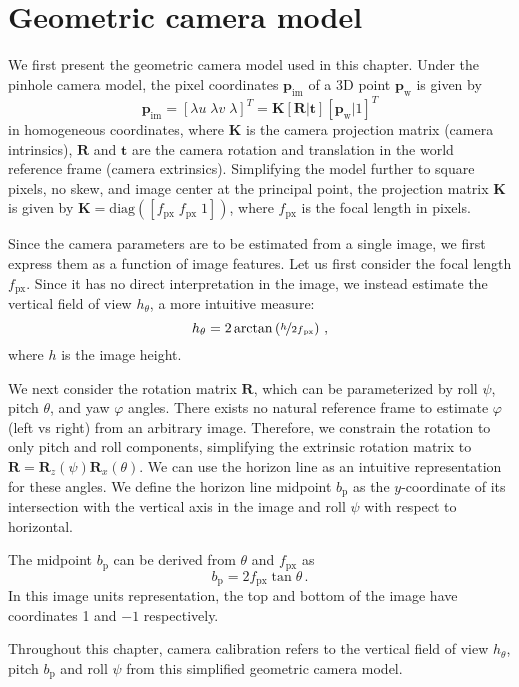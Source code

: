 \section{Geometric camera model}
\label{sec:camera-model}

We first present the geometric camera model used in this chapter. 
Under the pinhole camera model, the pixel coordinates $\mathbf{p}_\mathrm{im}$ of a 3D point $\mathbf{p}_\mathrm{w}$ is given by
%
\begin{equation}
\mathbf{p}_{\mathrm{im}} = [\lambda u \; \lambda v \; \lambda]^T = \mathbf{K} \left[\mathbf{R} | \mathbf{t}\right] \left[ \mathbf{p}_{\mathrm{w}} | 1 \right]^T
\end{equation}
%
in homogeneous coordinates, where $\mathbf{K}$ is the camera projection matrix (camera intrinsics), $\mathbf{R}$ and $\mathbf{t}$ are the camera rotation and translation in the world reference frame (camera extrinsics). Simplifying the model further to square pixels, no skew, and image center at the principal point, the projection matrix $\mathbf{K}$ is given by $\mathbf{K} = \mathrm{diag}([f_{\mathrm{px}} \; f_{\mathrm{px}} \; 1])$, where $f_{\mathrm{px}}$ is the focal length in pixels. 

Since the camera parameters are to be estimated from a single image, we first express them as a function of image features. Let us first consider the focal length $f_\mathrm{px}$. Since it has no direct interpretation in the image, we instead estimate the vertical field of view $h_\theta$, a more intuitive measure:
%
\begin{equation}
h_{\theta} = 2 \arctan \left( \nicefrac{ h }{ 2f{_\mathrm{px}} } \right) \,,
\end{equation}
%
where $h$ is the image height.

We next consider the rotation matrix $\mathbf{R}$, which can be parameterized by roll $\psi$, pitch $\theta$, and yaw $\varphi$ angles. There exists no natural reference frame to estimate $\varphi$ (left vs right) from an arbitrary image. Therefore, we constrain the rotation to only pitch and roll components, simplifying the extrinsic rotation matrix to $\mathbf{R} = \mathbf{R}_z(\psi) \mathbf{R}_x(\theta)$. We can use the horizon line as an intuitive representation for these angles. We define the horizon line midpoint $b_{\mathrm{p}}$ as the $y$-coordinate of its intersection with the vertical axis in the image and roll $\psi$ with respect to horizontal.

The midpoint $b_{\mathrm{p}}$ can be derived from $\theta$ and $f_{\mathrm{px}}$ as
%
\begin{equation}
b_{\mathrm{p}} = 2 f_{\mathrm{px}} \tan\theta \,.
\label{eq:horizon_midpoint}
\end{equation}
%
In this image units representation, the top and bottom of the image have coordinates 1 and $-1$ respectively. 

Throughout this chapter, camera calibration refers to the vertical field of view $h_{\theta}$, pitch $b_{\mathrm{p}}$ and roll $\psi$ from this simplified geometric camera model.
